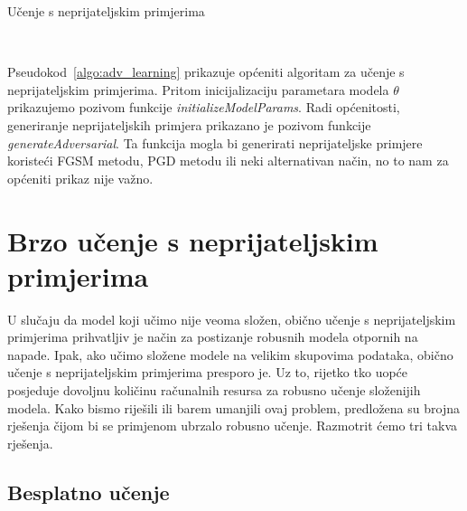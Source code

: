 \documentclass[times, utf8, zavrsni, numeric]{fer}
\begin{document}
\pagebreak

\begin{algorithm}
    \caption{Učenje s neprijateljskim primjerima}
    \label{algo:adv_learning}
    \begin{algorithmic}
        \\\hrulefill
            \ENDFOR
        \ENDFOR
    \end{algorithmic}
\end{algorithm}

Pseudokod~\ref{algo:adv_learning} prikazuje općeniti algoritam za učenje s neprijateljskim primjerima.
Pritom inicijalizaciju parametara modela $\theta$ prikazujemo pozivom funkcije \textit{initializeModelParams}.
Radi općenitosti, generiranje neprijateljskih primjera prikazano je pozivom funkcije \textit{generateAdversarial}.
Ta funkcija mogla bi generirati neprijateljske primjere koristeći FGSM metodu, PGD metodu ili neki alternativan način, no to nam za općeniti prikaz nije važno.

\section{Brzo učenje s neprijateljskim primjerima}

U slučaju da model koji učimo nije veoma složen, obično učenje s neprijateljskim primjerima prihvatljiv je način za postizanje robusnih modela otpornih na napade.
Ipak, ako učimo složene modele na velikim skupovima podataka, obično učenje s neprijateljskim primjerima presporo je. 
Uz to, rijetko tko uopće posjeduje dovoljnu količinu računalnih resursa za robusno učenje složenijih modela.
Kako bismo riješili ili barem umanjili ovaj problem, predložena su brojna rješenja čijom bi se primjenom ubrzalo robusno učenje. Razmotrit ćemo tri takva rješenja.

\pagebreak

\subsection{Besplatno učenje}
\end{document}
